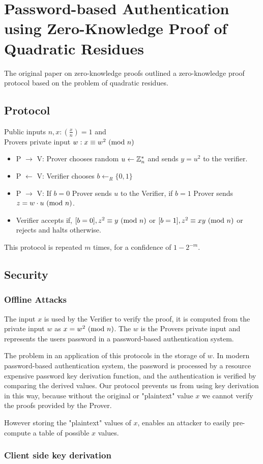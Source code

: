 \section{Password-based Authentication using Zero-Knowledge Proof of Quadratic Residues}

The original paper on zero-knowledge proofs outlined a zero-knowledge proof protocol based on the problem of quadratic residues.

\subsection{Protocol}

Public inputs $n,x: (\frac{x}{n}) = 1$ and\\
Provers private input $w: x \equiv w^2 \ (\mathrm{mod}\ n)$\\

\begin{itemize}
	\item P $\rightarrow$ V: Prover chooses random  $u \leftarrow \Bbb{Z}_{n}^{*}$ and sends $y = u^2$ to the verifier.
	\item P $\leftarrow$ V: Verifier chooses $b \leftarrow_R \{0, 1\} $
	\item P $\rightarrow$ V: If $b = 0$ Prover sends $u$ to the Verifier, if $b = 1$ Prover sends $z = w \cdot u \ (\mathrm{mod}\ n)$.
	\item Verifier accepts if, $[b = 0], z^2 \equiv y \ (\mathrm{mod}\ n)$ or $[b = 1], z^2 \equiv xy \ (\mathrm{mod}\ n)$ or rejects and halts otherwise.
\end{itemize}

This protocol is repeated $m$ times, for a confidence of $1 - 2^{-m}$.

\subsection{Security}

\subsubsection{Offline Attacks}
The input $x$ is used by the Verifier to verify the proof, it is computed from the private input $w$ as $x = w^2 \ (\mathrm{mod}\ n)$.
The $w$ is the Provers private input and represents the users password in a password-based authentication system.

The problem in an application of this protocols in the storage of $w$.
In modern password-based authentication system, the password is processed by a resource expensive password key derivation function, and the authentication is verified by comparing the derived values.
Our protocol prevents us from using key derivation in this way, because without the original or "plaintext" value $x$ we cannot verify the proofs provided by the Prover.

However storing the "plaintext" values of $x$, enables an attacker to easily pre-compute a table of possible $x$ values.

\subsubsection{Client side key derivation}



